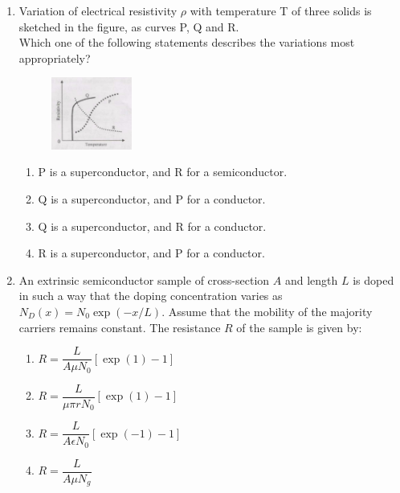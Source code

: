 \documentclass[journal,13pt,onecolumn]{IEEEtran}
\begin{document}
\begin{enumerate}[itemsep = 1em]
\item Variation of electrical resistivity $\rho$ with temperature T of three solids is sketched  in the figure, as curves P, Q and R.\\

Which one of the following statements describes the variations most appropriately?

\hfill{}

\begin{figure}[ht!]
    \centering
    \includegraphics[width=0.25\textwidth]{fig4.jpeg}
    \caption{}
    \label{fig:fig4.jpeg}
\end{figure}

\begin{enumerate}
    \item P is a superconductor, and R for a semiconductor.
    \item Q is a superconductor, and P for a conductor.
    \item Q is a superconductor, and R for a conductor.
    \item R is a superconductor, and P for a conductor.
    
\end{enumerate}

\item An extrinsic semiconductor sample of cross-section $A$ and length $L$ is doped in such a way that the doping concentration varies as $N_D(x) = N_0 \exp(-x/L)$. Assume that the mobility of the majority carriers remains constant. The resistance $R$ of the sample is given by:  

\hfill{}

\begin{multicols}{2}
\begin{enumerate}
    \item $R = \dfrac{L}{A \mu N_0} \left[\exp(1)-1\right]$
    \item $R = \dfrac{L}{\mu \pi r N_0} \left[\exp(1)-1\right]$
    \item $R = \dfrac{L}{A \epsilon N_0} \left[\exp(-1)-1\right]$
    \item $R = \dfrac{L}{A \mu N_g}$
\end{enumerate}
\end{multicols}


\end{enumerate}
\end{document}
